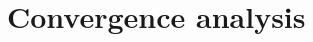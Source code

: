 \documentclass[reqno]{amsart}
\theoremstyle{plain}
\newtheorem{lemma}{Lemma}	%
\theoremstyle{definition}
\theoremstyle{remark}
\begin{document}
%
%



\section{Convergence analysis}
\label{app:rates}
\end{document}
